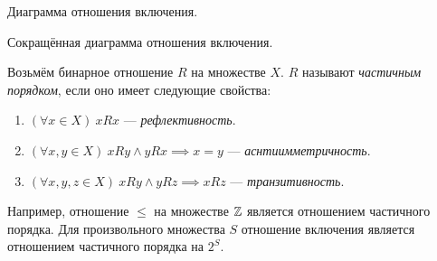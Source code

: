 \begin{marginfigure}
	\center

	\caption{Диаграмма отношения включения.}\label{fig:inc_diag}
\end{marginfigure}

\begin{marginfigure}
	\center

	\caption{Сокращённая диаграмма отношения включения.}\label{fig:inc_diag_short}
\end{marginfigure}

Возьмём бинарное отношение $R$ на множестве $X$. $R$ называют {\it частичным порядком},
если оно имеет следующие свойства:
\begin{enumerate}
	\item{}$(\forall x\in X)~xRx$ --- {\it рефлективность}.
	\item{}$(\forall x,y\in X)~xRy\land yRx\implies x=y$
		--- {\it аснтиимметричность}.
	\item{}$(\forall x,y,z\in X)~xRy\land yRz\implies xRz$ --- {\it транзитивность}.
\end{enumerate}
Например, отношение $\leq$ на множестве $\mathbb Z$ является отношением частичного порядка.
Для произвольного множества $S$ отношение включения является
отношением частичного порядка на $2^{S}$.

